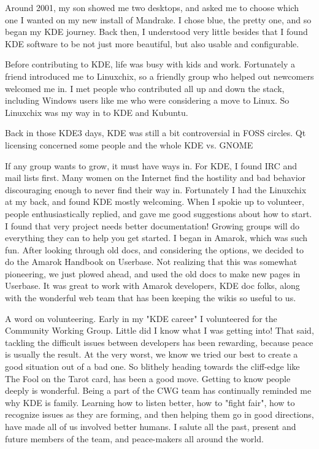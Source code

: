 

\noindent{}Around 2001, my son showed me two desktops, and asked me to choose which one I wanted on my new install of Mandrake. I chose blue, the pretty one, and so began my KDE journey. Back then, I understood very little besides that I found KDE software to be not just more beautiful, but also usable and configurable. 

Before contributing to KDE, life was busy with kids and work. Fortunately a friend introduced me to Linuxchix, so a friendly group who helped out newcomers welcomed me in. I met people who contributed all up and down the stack, including Windows users like me who were considering a move to Linux. So Linuxchix was my way in to KDE and Kubuntu.

Back in those KDE3 days, KDE was still a bit controversial in FOSS circles. Qt licensing concerned some people and the whole KDE vs. GNOME 

If any group wants to grow, it must have ways in. For KDE, I found IRC and mail lists first. Many women on the Internet find the hostility and bad behavior discouraging enough to never find their way in. Fortunately I had the Linuxchix at my back, and found KDE mostly welcoming. When I spokie up to volunteer, people enthusiastically replied, and gave me good suggestions about how to start. I found that very project needs better documentation! Growing groups will do everything they can to help you get started. I began in Amarok, which was such fun. After looking through old docs, and considering the options, we decided to do the Amarok Handbook on Userbase. Not realizing that this was somewhat pioneering, we just plowed ahead, and used the old docs to make new pages in Userbase. It was great to work with Amarok developers, KDE doc folks, along with the wonderful web team that has been keeping the wikis so useful to us. 

A word on volunteering. Early in my "KDE career" I volunteered for the Community Working Group. Little did I know what I was getting into! That said, tackling the difficult issues between developers has been rewarding, because peace is usually the result. At the very worst, we know we tried our best to create a good situation out of a bad one. So blithely heading towards the cliff-edge like The Fool on the Tarot card, has been a good move. Getting to know people deeply is wonderful. Being a part of the CWG team has continually reminded me why KDE is family. Learning how to listen better, how to "fight fair", how to recognize issues as they are forming, and then helping them go in good directions, have made all of us involved better humans. I salute all the past, present and future members of the team, and peace-makers all around the world.

